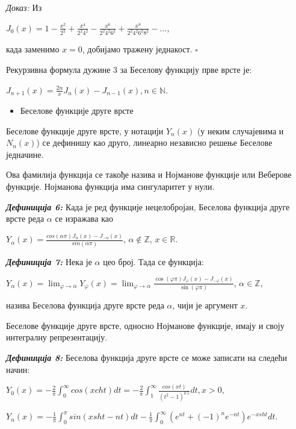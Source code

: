 \emph{Доказ:} Из

\(J_{0}(x) = 1 - \frac{x^{2}}{2^{2}} + \frac{x^{4}}{2^{2}4^{2}} - \frac{x^{6}}{2^{2}4^{2}6^{2}} + \frac{x^{8}}{2^{2}4^{2}6^{2}8^{2}} - ...\)\emph{,}

када заменимо \(x = 0\), добијамо тражену једнакост. \(\square\)

Рекурзивна формула дужине 3 за Беселову функцију прве врсте је:

\(J_{n + 1}\overset{}{(x)} = \frac{2n}{x}J_{n}\overset{}{(x)} - J_{n - 1}\overset{}{(x)},n\mathbb{\in N}\).

\begin{itemize}
\item
  Беселове функције друге врсте
\end{itemize}

Беселове функције друге врсте, у нотацији \(Y_{n}(x)\) (у неким
случајевима и \(N_{n}(x)\)) се дефинишу као друго, линеарно независно
решење Беселове једначине.

Ова фамилија функција се такође назива и Нојманове функције или Веберове
функције. Нојманова функција има сингуларитет у нули.

\emph{\textbf{Дефиниција 6:}} Када је ред функције нецелобројан,
Беселова функција друге врсте реда \(\alpha\) се изражава као

\(Y_{\alpha}(x) = \frac{cos(\alpha\pi)J_{\alpha}(x) - J_{- \alpha}(x)}{sin(\alpha\pi)}\),
\(\alpha\mathbb{\notin Z}\), \(x\mathbb{\in R}\).

\emph{\textbf{Дефиниција 7:}} Нека је \(\alpha\) цео број. Тада се
функција:

\(Y_{\alpha}\overset{}{(x)} = \lim_{\varphi \rightarrow \alpha}Y_{\varphi}\overset{}{(x)} = \lim_{\varphi \rightarrow \alpha}\frac{\cos(\varphi\pi)J_{\varphi}(x) - J_{- \varphi}(x)}{\sin(\varphi\pi)}\),
\(\alpha\mathbb{\in Z}\),

назива Беселова функција друге врсте реда \(\alpha\), чији је аргумент
\(x\).

Беселове функције друге врсте, односно Нојманове функције, имају и своју
интегралну репрезентацију.

\emph{\textbf{Дефиниција 8:}} Беселова функција друге врсте се може
записати на следећи начин:

\(Y_{0}(x) = - \frac{2}{\pi}\int_{0}^{\infty}cos(xcht)dt = - \frac{2}{\pi}\int_{1}^{\infty}\frac{cos(xt)}{{(t^{2} - 1)}^{0.5}}dt,x > 0\),

\(Y_{n}(x) = - \frac{1}{\pi}\int_{0}^{\pi}sin(xsht - nt)dt - \frac{1}{\pi}\int_{0}^{\infty}(e^{nt} + {( - 1)}^{n}e^{- nt})e^{- xsht}dt\).

